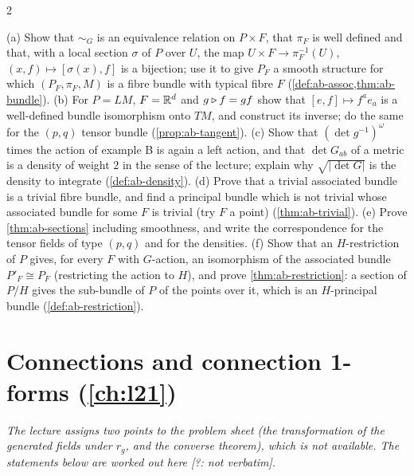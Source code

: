 \begin{paracol}{2}
\begin{exercise}\label{ex:ab-full}
(a) Show that $\sim_G$ is an equivalence relation on $P\times F$, that $\pi_F$ is well defined and that, with a local section $\sigma$ of $P$ over $U$, the map $U\times F\to\pi_F^{-1}(U)$, $(x,f)\mapsto[\sigma(x),f]$ is a bijection; use it to give $P_F$ a smooth structure for which $(P_F,\pi_F,M)$ is a fibre bundle with typical fibre $F$ (\cref{def:ab-assoc,thm:ab-bundle}). (b) For $P=LM$, $F=\mathbb{R}^d$ and $g\mathbin{\triangleright} f=gf$ show that $[e,f]\mapsto f^ae_a$ is a well-defined bundle isomorphism onto $TM$, and construct its inverse; do the same for the $(p,q)$ tensor bundle (\cref{prop:ab-tangent}). (c) Show that $(\det g^{-1})^\omega$ times the action of example B is again a left action, and that $\det G_{ab}$ of a metric is a density of weight $2$ in the sense of the lecture; explain why $\sqrt{|\det G|}$ is the density to integrate (\cref{def:ab-density}). (d) Prove that a trivial associated bundle is a trivial fibre bundle, and find a principal bundle which is not trivial whose associated bundle for some $F$ is trivial (try $F$ a point) (\cref{thm:ab-trivial}). (e) Prove \cref{thm:ab-sections} including smoothness, and write the correspondence for the tensor fields of type $(p,q)$ and for the densities. (f) Show that an $H$-restriction of $P$ gives, for every $F$ with $G$-action, an isomorphism of the associated bundle $P'_F\cong P_F$ (restricting the action to $H$), and prove \cref{thm:ab-restriction}: a section of $P/H$ gives the sub-bundle of $P$ of the points over it, which is an $H$-principal bundle (\cref{def:ab-restriction}).
\end{exercise}

\section{Connections and connection 1-forms (\cref{ch:l21})}\label{exam:ch21}

\emph{The lecture assigns two points to the problem sheet (the transformation of the generated fields under $r_g$, and the converse theorem), which is not available. The statements below are worked out here [?: not verbatim].}


\end{paracol}
